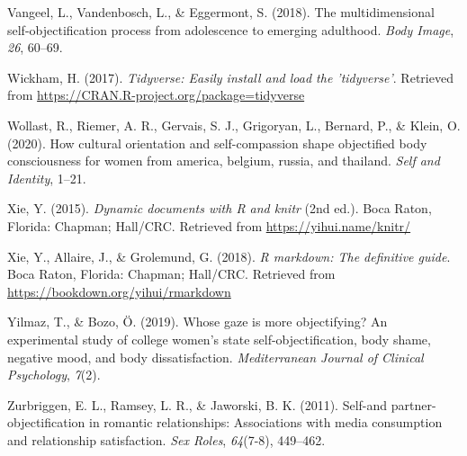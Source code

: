 \documentclass[man]{apa6}
\begin{document}
\hypertarget{ref-vangeel2018multidimensional}{}
Vangeel, L., Vandenbosch, L., \& Eggermont, S. (2018). The
multidimensional self-objectification process from adolescence to
emerging adulthood. \emph{Body Image}, \emph{26}, 60--69.

\hypertarget{ref-R-tidyverse}{}
Wickham, H. (2017). \emph{Tidyverse: Easily install and load the
'tidyverse'}. Retrieved from
\url{https://CRAN.R-project.org/package=tidyverse}

\hypertarget{ref-wollast2020cultural}{}
Wollast, R., Riemer, A. R., Gervais, S. J., Grigoryan, L., Bernard, P.,
\& Klein, O. (2020). How cultural orientation and self-compassion shape
objectified body consciousness for women from america, belgium, russia,
and thailand. \emph{Self and Identity}, 1--21.

\hypertarget{ref-R-knitr}{}
Xie, Y. (2015). \emph{Dynamic documents with R and knitr} (2nd ed.).
Boca Raton, Florida: Chapman; Hall/CRC. Retrieved from
\url{https://yihui.name/knitr/}

\hypertarget{ref-R-rmarkdown}{}
Xie, Y., Allaire, J., \& Grolemund, G. (2018). \emph{R markdown: The
definitive guide}. Boca Raton, Florida: Chapman; Hall/CRC. Retrieved
from \url{https://bookdown.org/yihui/rmarkdown}

\hypertarget{ref-yilmaz2019whose}{}
Yilmaz, T., \& Bozo, Ö. (2019). Whose gaze is more objectifying? An
experimental study of college women's state self-objectification, body
shame, negative mood, and body dissatisfaction. \emph{Mediterranean
Journal of Clinical Psychology}, \emph{7}(2).

\hypertarget{ref-zurbriggen2011self}{}
Zurbriggen, E. L., Ramsey, L. R., \& Jaworski, B. K. (2011). Self-and
partner-objectification in romantic relationships: Associations with
media consumption and relationship satisfaction. \emph{Sex Roles},
\emph{64}(7-8), 449--462.

\endgroup
\end{document}
